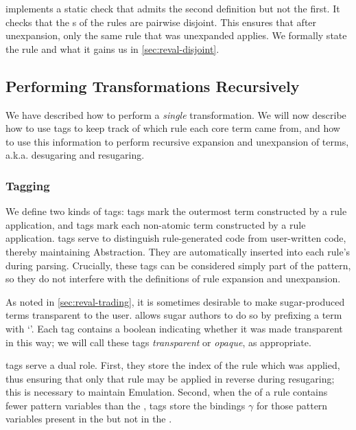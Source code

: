 {\Resugarer} implements a static check that admits the second definition
but not the first. It checks that the s of the rules are pairwise
disjoint. This
ensures that after unexpansion, only the same rule that was unexpanded
applies. We formally state the rule and what it gains us in
\cref{sec:reval-disjoint}.

\subsection{Performing Transformations Recursively}
\label{sec:reval-manyrule}

We have described how to perform a \emph{single} transformation. We will now
describe how to use tags to keep track of which rule each core term came
from, and how to use this information to perform recursive expansion and
unexpansion of terms, a.k.a. desugaring and resugaring.

\subsubsection{Tagging}
\label{sec:reval-tagging}

We define two kinds of tags: {\MacHeadf} tags mark the outermost term
constructed by a rule application, and {\MacBodyf} tags mark each
non-atomic term constructed by a rule application. {\MacBodyf} tags serve
to distinguish rule-generated code from user-written code, thereby
maintaining Abstraction. They are automatically inserted into each rule's
 during parsing. Crucially, these tags can be considered simply part
of the  pattern, so they do not interfere with the definitions of
rule expansion and unexpansion. 

As noted in
\cref{sec:reval-trading}, it is sometimes desirable to make sugar-produced
terms transparent to the user. {\Resugarer} allows sugar authors to do so by
prefixing a term with `\Code{!}'. Each {\MacBodyf} tag contains a boolean
indicating whether it was made transparent in this way; we will call these tags
\emph{transparent} or \emph{opaque}, as appropriate.

{\MacHeadf} tags serve a dual role. First, they store the index of the
rule which was applied, thus ensuring that only that rule may be applied
in reverse during resugaring; this is necessary to maintain
Emulation. Second, when the  of a rule contains fewer pattern variables than
the , {\MacHeadf} tags store the bindings $\gamma$ for those
pattern variables present in the  but not in the .

